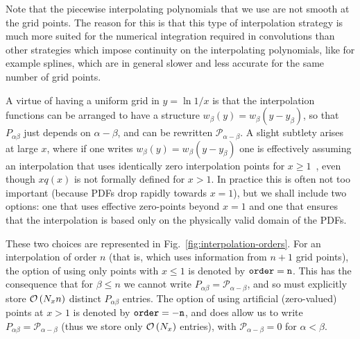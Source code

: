\documentclass[12pt]{article}
\newcommand{\order}[1]{{\cal O}\left(#1\right)}
\begin{document}
Note that the piecewise  interpolating polynomials 
that we use are not smooth at the
grid points. The reason for this is that this type of interpolation
strategy is much more suited for the numerical integration required
in convolutions than other strategies which impose continuity
on the interpolating polynomials, like for example splines, which
are in general slower and less accurate for the same number
of grid points.


A virtue
 of having a uniform grid in $y = \ln 1/x$ is that the
interpolation functions can be arranged to have a structure
$w_\beta(y) = w_{\beta}(y - y_\beta)$, so that $P_{\alpha\beta}$ just depends
on $\alpha - \beta$, and can be rewritten $\mathcal{P}_{\alpha - \beta}$. A
slight subtlety arises at large $x$, where if one writes $w_\beta(y) =
w_{\beta}(y - y_\beta)$ one is effectively assuming an interpolation that uses
identically zero interpolation points for $x\ge 1$~\cite{coriano,
Ratcliffe:2000kp},
even though $xq(x)$ is not formally defined for $x > 1$. In practice
this is often not too important (because PDFs drop rapidly towards
$x=1$), but we shall include two options: one that uses effective
zero-points beyond $x=1$ and one that ensures that the interpolation
is based only on the physically valid domain of the PDFs.

These two choices are represented in
Fig.~\ref{fig:interpolation-orders}.  For an interpolation of order
$n$ (that is, which uses information from $n+1$ grid points), the
option of using only points with $x\le 1$ is denoted by $\tt order=n$.
This has the consequence that for $\beta \le n$ we cannot write
$P_{\alpha\beta} = \mathcal{P}_{\alpha-\beta}$, and so must explicitly
store $\order{N_x n}$ distinct $P_{\alpha\beta}$ entries.
%
The option of using artificial (zero-valued) points at $x>1$ is denoted by $\tt
order=-n$, and does allow us to write $P_{\alpha\beta} =
\mathcal{P}_{\alpha-\beta}$ (thus we store only $\order{N_x}$
entries), with $\mathcal{P}_{\alpha-\beta} = 0$ for $\alpha < \beta$.


\end{document}
